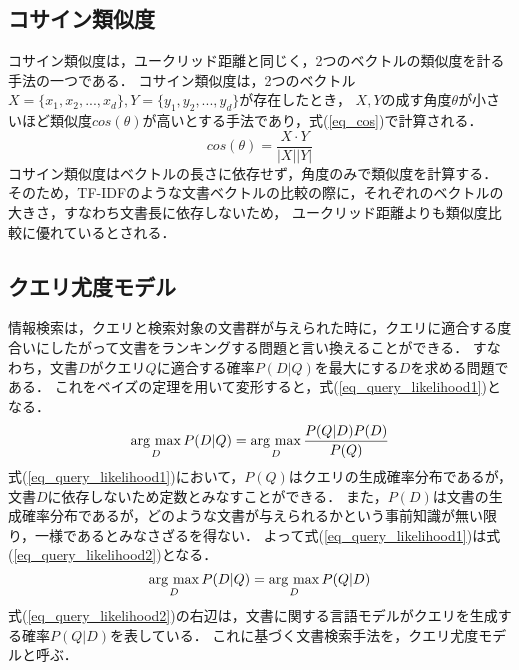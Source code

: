 \subsection{コサイン類似度} \label{sec_cosine}
コサイン類似度は，ユークリッド距離と同じく，2つのベクトルの類似度を計る手法の一つである．
コサイン類似度は，2つのベクトル$X = \{x_1, x_2, ..., x_d\}, Y = \{y_1, y_2, ..., y_d\}$が存在したとき，
$X, Y$の成す角度$\theta$が小さいほど類似度$cos(\theta)$が高いとする手法であり，式(\ref{eq_cos})で計算される．
\begin{equation}
    cos(\theta) = \frac{X \cdot Y}{|X||Y|}  \label{eq_cos}
\end{equation}
コサイン類似度はベクトルの長さに依存せず，角度のみで類似度を計算する．
そのため，TF-IDFのような文書ベクトルの比較の際に，それぞれのベクトルの大きさ，すなわち文書長に依存しないため，
ユークリッド距離よりも類似度比較に優れているとされる．

\subsection{クエリ尤度モデル}
情報検索は，クエリと検索対象の文書群が与えられた時に，クエリに適合する度合いにしたがって文書をランキングする問題と言い換えることができる．
すなわち，文書$D$がクエリ$Q$に適合する確率$P(D|Q)$を最大にする$D$を求める問題である．
これをベイズの定理を用いて変形すると，式(\ref{eq_query_likelihood1})となる．
\begin{equation}
    \mathop{\rm arg~max}\limits_{D} P(D|Q) = \mathop{\rm arg~max}\limits_{D} \frac{P(Q|D)P(D)}{P(Q)}    \label{eq_query_likelihood1}
\end{equation}
式(\ref{eq_query_likelihood1})において，$P(Q)$はクエリの生成確率分布であるが，文書$D$に依存しないため定数とみなすことができる．
また，$P(D)$は文書の生成確率分布であるが，どのような文書が与えられるかという事前知識が無い限り，一様であるとみなさざるを得ない．
よって式(\ref{eq_query_likelihood1})は式(\ref{eq_query_likelihood2})となる．
\begin{equation}
    \mathop{\rm arg~max}\limits_{D} P(D|Q) = \mathop{\rm arg~max}\limits_{D} P(Q|D) \label{eq_query_likelihood2}
\end{equation}
式(\ref{eq_query_likelihood2})の右辺は，文書に関する言語モデルがクエリを生成する確率$P(Q|D)$を表している．
これに基づく文書検索手法を，クエリ尤度モデルと呼ぶ．

